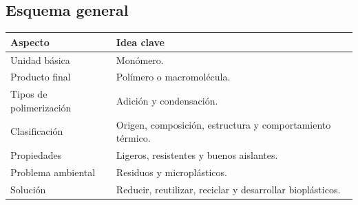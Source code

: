 
\subsection{Esquema general}

\begin{center}

\renewcommand{\arraystretch}{1.4}

\begin{tabular}{p{4cm}p{8cm}}

\toprule

\textbf{Aspecto}

&

\textbf{Idea clave}

\\

\midrule

Unidad básica

&

Monómero.

\\

Producto final

&

Polímero o macromolécula.

\\

Tipos de polimerización

&

Adición y condensación.

\\

Clasificación

&

Origen, composición, estructura y comportamiento térmico.

\\

Propiedades

&

Ligeros, resistentes y buenos aislantes.

\\

Problema ambiental

&

Residuos y microplásticos.

\\

Solución

&

Reducir, reutilizar, reciclar y desarrollar bioplásticos.

\\

\bottomrule

\end{tabular}

\end{center}

